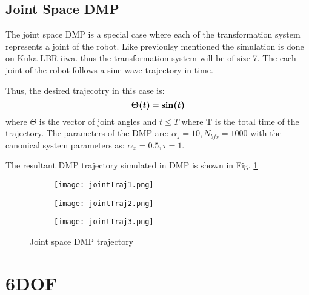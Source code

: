 \subsection{Joint Space DMP}
The joint space DMP is a special case where each of the transformation system represents a joint of the robot.
Like previoulsy mentioned the simulation is done on Kuka LBR iiwa. thus the transformation system will be of size 7.
The each joint of the robot follows a sine wave trajectory in time. 

Thus, the desired trajecotry in this case is:
\begin{equation}
    \boldsymbol{\Theta(t)} = \boldsymbol{\sin(t)} 
\end{equation}
where $\Theta$ is the vector of joint angles and $t \leq T$ where T is the total time of the trajectory.
The parameters of the DMP are: $\alpha_z = 10, N_{bfs} = 1000$ with the canonical system parameters as: 
$\alpha_x = 0.5, \tau = 1$.

The resultant DMP trajectory simulated in DMP is shown in Fig. \ref{fig:joint_traj_pybullet}

\begin{figure}[h]
    \centering
    \begin{subfigure}{0.3\textwidth}
        \texttt{[image: jointTraj1.png]}
    \end{subfigure}%
    \begin{subfigure}{0.3\textwidth}
        \texttt{[image: jointTraj2.png]}
    \end{subfigure}%
    \begin{subfigure}{0.3\textwidth}
        \texttt{[image: jointTraj3.png]}
    \end{subfigure}%
    \caption{Joint space DMP trajectory}
    \label{fig:joint_traj_pybullet}

\end{figure}

\section{6DOF }
















